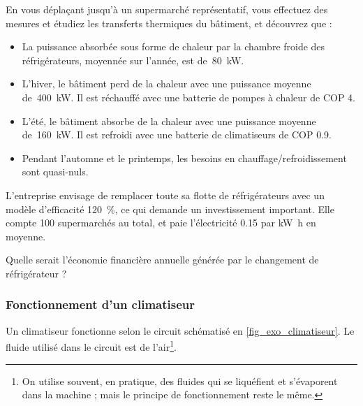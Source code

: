 	En vous déplaçant jusqu’à un supermarché représentatif, vous effectuez des mesures et étudiez les transferts thermiques du bâtiment, et découvrez que :
	
	\begin{itemize}
		\item La puissance absorbée sous forme de chaleur par la chambre froide des réfrigérateurs, moyennée sur l’année, est de~\SI{80}{\kilo\watt}.
		\item L’hiver, le bâtiment perd de la chaleur avec une puissance moyenne de~\SI{400}{\kilo\watt}. Il est réchauffé avec une batterie de pompes à chaleur de COP \num{4}.
		\item L’été, le bâtiment absorbe de la chaleur avec une puissance moyenne de~\SI{160}{\kilo\watt}. Il est refroidi avec une batterie de climatiseurs de COP \num{0,9}.
		\item Pendant l’automne et le printemps, les besoins en chauffage/refroidissement sont quasi-nuls.
	\end{itemize}
	
	L’entreprise envisage de remplacer toute sa flotte de réfrigérateurs avec un modèle d’efficacité \SI{120}{\percent}, ce qui demande un investissement important. Elle compte 100 supermarchés au total, et paie l’électricité \SI{0,15}{\euroo} par \si{\kilo\watt\hour} en moyenne.
	
	Quelle serait l’économie financière annuelle générée par le changement de réfrigérateur ?
	
\subsubsection{Fonctionnement d’un climatiseur}

	Un climatiseur fonctionne selon le circuit schématisé en \cref{fig_exo_climatiseur}. Le fluide utilisé dans le circuit est de l’air\footnote{On utilise souvent, en pratique, des fluides qui se liquéfient et s’évaporent dans la machine ; mais le principe de fonctionnement reste le même.}\nolinebreak.
	
